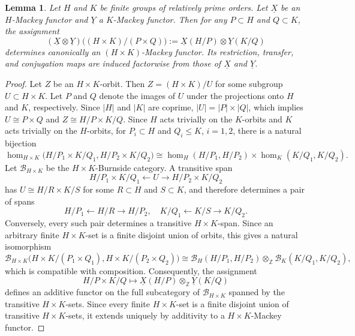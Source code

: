 \documentclass{amsart}
\theoremstyle{plain}
\newtheorem{lemma}[theorem]{Lemma}
\theoremstyle{definition}
\theoremstyle{remark}
\begin{document}
\begin{lemma}\label{lem:tensor product}
Let $H$ and $K$ be finite groups of relatively prime orders. Let $\underline X$ be an $H$-Mackey functor and $\underline Y$ a $K$-Mackey functor. Then for any $P\subset H$ and $Q\subset K$, the assignment
\[
(\underline X\otimes\underline Y)\bigl((H\times K)/(P\times Q)\bigr)
:=
\underline X(H/P)\otimes\underline Y(K/Q)
\]
determines canonically an $(H\times K)$-Mackey functor. Its restriction, transfer, and conjugation maps are induced factorwise from those of $\underline X$ and $\underline Y$.
\end{lemma}
\begin{proof}
    Let $Z$ be an $H\times K$-orbit. Then $Z = (H \times K)/U$ for some subgroup $U \subset H \times K$. Let $P$ and $Q$ denote the images of $U$ under the projections onto $H$ and $K$, respectively. Since $|H|$ and $|K|$ are coprime, $|U| = |P| \times |Q|$, which implies $U \cong P \times Q$ and $Z \cong H/P \times K/Q$. 
    Since $H$ acts trivially on the $K$-orbits and $K$ acts trivially on the $H$-orbits, for $P_i\subset H$ and $Q_i\le K$, $i=1,2$, there is a natural bijection 
    \[
    \hom_{H\times K} \bigl(H/P_1\times K/Q_1,H/P_2\times K/Q_2\bigr)
    \cong 
    \hom_{H}(H/P_1,H/P_2) \times \hom_{K}(K/Q_1,K/Q_2). 
    \]
    Let $\mathcal B_{H\times K}$ be the $H\times K$-Burnside category. A transitive span
    $$H/P_1\times K/Q_1 \longleftarrow U \longrightarrow H/P_2\times K/Q_2$$
    has $U\cong H/R\times K/S$ for some $R\subset H$ and $S\subset K$, and therefore determines a pair of spans
    $$H/P_1\longleftarrow H/R\longrightarrow H/P_2,\quad K/Q_1\longleftarrow K/S\longrightarrow K/Q_2.$$
    Conversely, every such pair determines a transitive $H\times K$-span. Since an arbitrary finite $H\times K$-set is a finite disjoint union of orbits, this gives a natural isomorphism
    $$\mathcal B_{H\times K}
    \bigl(H\times K /(P_1\times Q_1),H\times K/(P_2\times Q_2)\bigr)
    \cong
    \mathcal B_H(H/P_1,H/P_2)
    \otimes_{\mathbb Z}
    \mathcal B_K(K/Q_1,K/Q_2),$$
    which is compatible with composition. Consequently, the assignment
    \[
    H/P\times K/Q
    \longmapsto
    \underline X(H/P)\otimes_{\mathbb Z}\underline Y(K/Q)
    \]
    defines an additive functor on the full subcategory of $\mathcal B_{H\times K}$ spanned by the transitive $H\times K$-sets. Since every finite $H\times K$-set is a finite disjoint union of transitive $H\times K$-sets, it extends uniquely by additivity to a $H\times K$-Mackey functor.
\end{proof}
\end{document}
